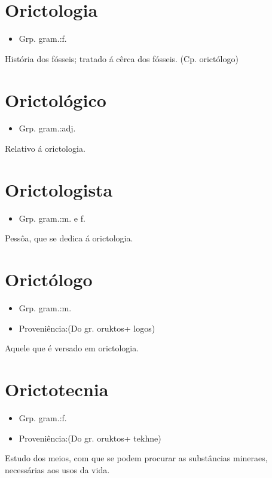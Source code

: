 \section{Orictologia}
\begin{itemize}
\item {Grp. gram.:f.}
\end{itemize}
História dos fósseis; tratado á cêrca dos fósseis.
(Cp. \textunderscore orictólogo\textunderscore )
\section{Orictológico}
\begin{itemize}
\item {Grp. gram.:adj.}
\end{itemize}
Relativo á orictologia.
\section{Orictologista}
\begin{itemize}
\item {Grp. gram.:m.  e  f.}
\end{itemize}
Pessôa, que se dedica á orictologia.
\section{Orictólogo}
\begin{itemize}
\item {Grp. gram.:m.}
\end{itemize}
\begin{itemize}
\item {Proveniência:(Do gr. \textunderscore oruktos\textunderscore  + \textunderscore logos\textunderscore )}
\end{itemize}
Aquele que é versado em orictologia.
\section{Orictotecnia}
\begin{itemize}
\item {Grp. gram.:f.}
\end{itemize}
\begin{itemize}
\item {Proveniência:(Do gr. \textunderscore oruktos\textunderscore  + \textunderscore tekhne\textunderscore )}
\end{itemize}
Estudo dos meios, com que se podem procurar as substâncias mineraes, necessárias aos usos da vida.
